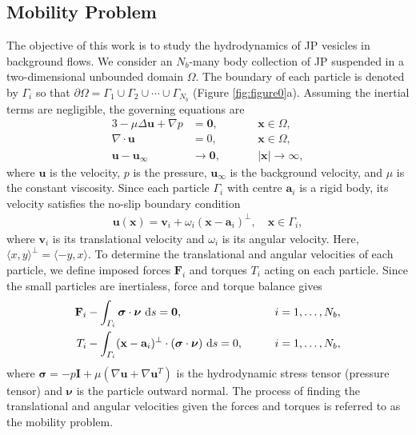 \documentclass[lineno]{jfm}
\renewcommand{\aa}{\mathbf{a}}
\newcommand{\bd}{\partial}
\newcommand{\FF}{\mathbf{F}}
\newcommand{\nnu}{\boldsymbol{\nu}}
\newcommand{\ssigma}{\boldsymbol{\sigma}}
\newcommand{\xx}{\mathbf{x}}
\newcommand{\uu}{\mathbf{u}}
\renewcommand{\vv}{\mathbf{v}}
\begin{document}
\subsection{\label{mobility}Mobility Problem}
The objective of this work is to study the hydrodynamics of JP vesicles
in background flows. We consider an $N_b$-many body collection of JP
suspended in a two-dimensional unbounded domain $\Omega$. The boundary
of each particle is denoted by $\Gamma_i$ so that $\bd \Omega = \Gamma_1
\cup \Gamma_2 \cup \cdots \cup \Gamma_{N_b}$ (Figure
\ref{fig:figure0}a). Assuming the inertial terms are negligible, the
governing equations are
\begin{alignat}{3}
\label{eq:stokes}
  -\mu \Delta \uu + \nabla p &= \mathbf{0}, 
    && \xx \in \Omega, \\
  \nabla\cdot \uu &= 0, \qquad && \xx \in \Omega, \\
  \uu - \uu_\infty &\to \mathbf{0}, && |\xx| \to \infty,
\end{alignat}
%
where $\uu$ is the velocity, $p$ is the
pressure, $\uu_\infty$ is the background velocity, and $\mu$ is the constant viscosity. 
%
Since each particle $\Gamma_i$ with centre $\aa_i$ is a rigid body, its velocity satisfies 
the no-slip boundary condition
\begin{align}
\label{eq:rigid_bc}
  \uu(\xx) = \vv_i + \omega_i (\xx - \aa_i)^\perp, \quad 
    \xx \in \Gamma_i,
\end{align}
where $\vv_i$ is its translational velocity and $\omega_i$ is its
angular velocity. Here, $\langle x, y \rangle^{\perp} = \langle -y, x
\rangle$.
%
%
%
%
To determine the translational and angular velocities of each particle,
we define imposed forces $\FF_i$ and torques $T_i$ acting on each
particle. Since the small particles are inertialess, force and torque
balance gives 
\begin{alignat}{2}
  \label{eq:force}
  \FF_i &- \int_{\Gamma_i} \ssigma \cdot \nnu \, \dif s = \mathbf{0},
  && i=1,\ldots,N_b,\\
  \label{eq:torque}
  T_i &- \int_{\Gamma_i} (\xx - \aa_i)^\perp \cdot 
    (\ssigma \cdot \nnu) \, \dif s = 0, \qquad && i=1,\ldots,N_b,
\end{alignat}
where $\ssigma = -p \mathbf{I} + \mu \left(\nabla \uu + \nabla \uu^T
\right)$ is the hydrodynamic stress tensor (pressure tensor) and
$\nnu$ is the particle outward normal. The process of finding the
translational and angular velocities given the forces and torques is
referred to as the mobility problem.
\end{document}
